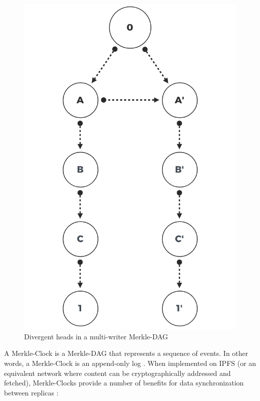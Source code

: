 \documentclass{textile}
\begin{document}
\begin{figure}
  \includegraphics[width=\linewidth]{figures/Divergent_Heads.png}
  \caption{Divergent heads in a multi-writer Merkle-DAG }
  \label{fig:merkledag}
\end{figure}

A Merkle-Clock is a Merkle-DAG that represents a sequence of events. In other words, a Merkle-Clock is an append-only log \cite{sanjuanMerkleCRDTs2019}. When implemented on IPFS (or an equivalent network where content can be cryptographically addressed and fetched), Merkle-Clocks provide a number of benefits for data synchronization between replicas \cite[sec. 4.3]{sanjuanMerkleCRDTs2019}:
\end{document}
